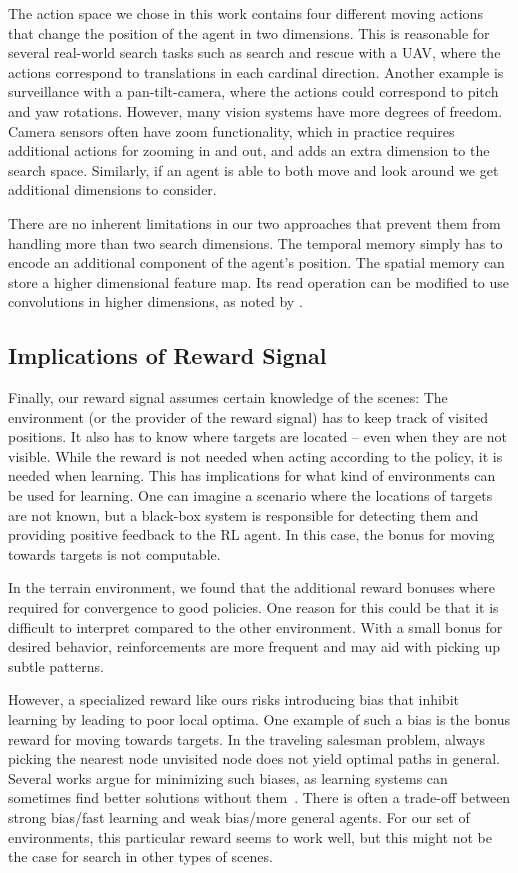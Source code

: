The action space we chose in this work contains four different moving actions that change the position of the agent in two dimensions.
This is reasonable for several real-world search tasks such as search and rescue with a UAV, where the actions correspond to translations in each cardinal direction.
Another example is surveillance with a pan-tilt-camera, where the actions could correspond to pitch and yaw rotations.
However, many vision systems have more degrees of freedom.
Camera sensors often have zoom functionality, which in practice requires additional actions for zooming in and out, and adds an extra dimension to the search space.
Similarly, if an agent is able to both move and look around we get additional dimensions to consider.

There are no inherent limitations in our two approaches that prevent them from handling more than two search dimensions.
The temporal memory simply has to encode an additional component of the agent's position.
The spatial memory can store a higher dimensional feature map.
Its read operation can be modified to use convolutions in higher dimensions, as noted by \cite{parisotto_neural_2017}.

\subsection{Implications of Reward Signal}

Finally, our reward signal assumes certain knowledge of the scenes:
The environment (or the provider of the reward signal) has to keep track of visited positions.
It also has to know where targets are located -- even when they are not visible.
While the reward is not needed when acting according to the policy, it is needed when learning.
This has implications for what kind of environments can be used for learning.
One can imagine a scenario where the locations of targets are not known, but a black-box system is responsible for detecting them and providing positive feedback to the RL agent.
In this case, the bonus for moving towards targets is not computable.

In the terrain environment, we found that the additional reward bonuses where required for convergence to good policies.
One reason for this could be that it is difficult to interpret compared to the other environment.
With a small bonus for desired behavior, reinforcements are more frequent and may aid with picking up subtle patterns.

However, a specialized reward like ours risks introducing bias that inhibit learning by leading to poor local optima.
One example of such a bias is the bonus reward for moving towards targets.
In the traveling salesman problem, always picking the nearest node unvisited node does not yield optimal paths in general.
Several works argue for minimizing such biases, as learning systems can sometimes find better solutions without them~\cite{hessel_inductive_2019}.
There is often a trade-off between strong bias/fast learning and weak bias/more general agents.
For our set of environments, this particular reward seems to work well, but this might not be the case for search in other types of scenes.

